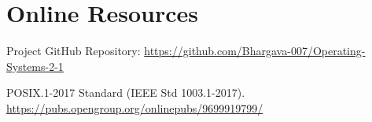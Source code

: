 \documentclass[12pt,a4paper]{report}
\begin{document}
\section{Online Resources}
\begin{enumerate}[leftmargin=1.8em, label={[\arabic*]}]
  \item Project GitHub Repository: \url{https://github.com/Bhargava-007/Operating-Systems-2-1}
  \item POSIX.1-2017 Standard (IEEE Std 1003.1-2017). \url{https://pubs.opengroup.org/onlinepubs/9699919799/}
\end{enumerate}
\end{document}
